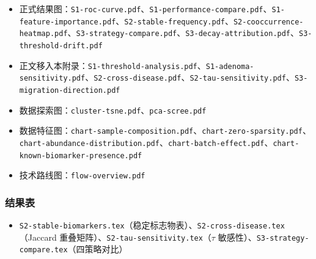 \begin{itemize}\setlength{\itemsep}{0pt}\raggedright
  \item 正式结果图：\texttt{S1-roc-curve.pdf}、\texttt{S1-performance-compare.pdf}、\texttt{S1-feature-importance.pdf}、\texttt{S2-stable-frequency.pdf}、\texttt{S2-cooccurrence-heatmap.pdf}、\texttt{S3-strategy-compare.pdf}、\texttt{S3-decay-attribution.pdf}、\texttt{S3-threshold-drift.pdf}
  \item 正文移入本附录：\texttt{S1-threshold-analysis.pdf}、\texttt{S1-adenoma-sensitivity.pdf}、\texttt{S2-cross-disease.pdf}、\texttt{S2-tau-sensitivity.pdf}、\texttt{S3-migration-direction.pdf}
  \item 数据探索图：\texttt{cluster-tsne.pdf}、\texttt{pca-scree.pdf}
  \item 数据特征图：\texttt{chart-sample-composition.pdf}、\texttt{chart-zero-sparsity.pdf}、\texttt{chart-abundance-distribution.pdf}、\texttt{chart-batch-effect.pdf}、\texttt{chart-known-biomarker-presence.pdf}
  \item 技术路线图：\texttt{flow-overview.pdf}
\end{itemize}

\subsubsection*{结果表}

\begin{itemize}\setlength{\itemsep}{0pt}
  \item \texttt{S2-stable-biomarkers.tex}（稳定标志物表）、\texttt{S2-cross-disease.tex}（Jaccard 重叠矩阵）、\texttt{S2-tau-sensitivity.tex}（$\tau$ 敏感性）、\texttt{S3-strategy-compare.tex}（四策略对比）
\end{itemize}
